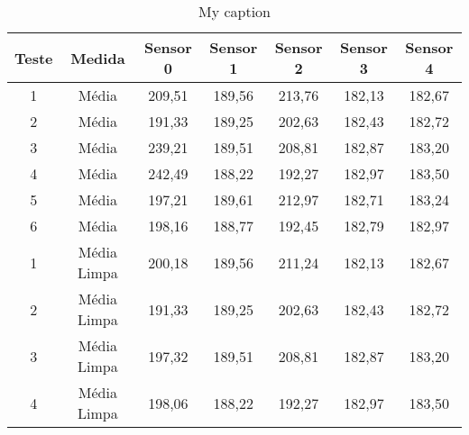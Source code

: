 \begin{table}[]
\centering
\caption{My caption}
\label{my-label}
\begin{tabular}{|c|c|ccccc|}
\hline
\textbf{Teste} & \textbf{Medida}                                                            & \textbf{Sensor 0} & \textbf{Sensor 1} & \textbf{Sensor 2} & \textbf{Sensor 3} & \textbf{Sensor 4} \\ \hline
1              & Média                                                                      & 209,51            & 189,56            & 213,76            & 182,13            & 182,67            \\
2              & Média                                                                      & 191,33            & 189,25            & 202,63            & 182,43            & 182,72            \\
3              & Média                                                                      & 239,21            & 189,51            & 208,81            & 182,87            & 183,20            \\
4              & Média                                                                      & 242,49            & 188,22            & 192,27            & 182,97            & 183,50            \\
5              & Média                                                                      & 197,21            & 189,61            & 212,97            & 182,71            & 183,24            \\
6              & Média                                                                      & 198,16            & 188,77            & 192,45            & 182,79            & 182,97            \\ \hline
1              & Média Limpa                                                                & 200,18            & 189,56            & 211,24            & 182,13            & 182,67            \\
2              & Média Limpa                                                                & 191,33            & 189,25            & 202,63            & 182,43            & 182,72            \\
3              & Média Limpa                                                                & 197,32            & 189,51            & 208,81            & 182,87            & 183,20            \\
4              & Média Limpa                                                                & 198,06            & 188,22            & 192,27            & 182,97            & 183,50            \\

\end{tabular}
\end{table}
